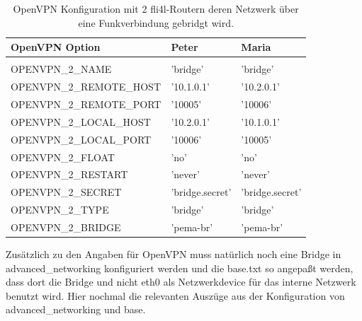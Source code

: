 \begin{table}[htbp]
  \begin{scriptsize}
    \begin{tabular}{lll}
      OpenVPN Option           & Peter           & Maria           \\
      \hline \\
      OPENVPN\_2\_NAME         & 'bridge'        & 'bridge'          \\
      OPENVPN\_2\_REMOTE\_HOST & '10.1.0.1'      & '10.2.0.1'      \\
      OPENVPN\_2\_REMOTE\_PORT & '10005'         & '10006'         \\
      OPENVPN\_2\_LOCAL\_HOST  & '10.2.0.1'      & '10.1.0.1'      \\
      OPENVPN\_2\_LOCAL\_PORT  & '10006'         & '10005'         \\
      OPENVPN\_2\_FLOAT        & 'no'            & 'no'            \\
      OPENVPN\_2\_RESTART      & 'never'         & 'never'         \\
      OPENVPN\_2\_SECRET       & 'bridge.secret' & 'bridge.secret' \\
      OPENVPN\_2\_TYPE         & 'bridge'        & 'bridge'        \\
      OPENVPN\_2\_BRIDGE       & 'pema-br'       & 'pema-br'       \\
    \end{tabular}
  \end{scriptsize}
  \caption{OpenVPN Konfiguration mit 2 fli4l-Routern deren Netzwerk über eine Funkverbindung gebridgt wird.}
\end{table}

Zusätzlich zu den Angaben für OpenVPN muss natürlich noch eine Bridge
in advanced\_networking konfiguriert werden und die base.txt so
angepaßt werden, dass dort die Bridge und nicht eth0 als
Netzwerkdevice für das interne Netzwerk benutzt wird. Hier nochmal die
relevanten Auszüge aus der Konfiguration von advanced\_networking und
base.

